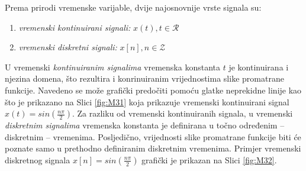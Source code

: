 \documentclass[a4paper,12pt,oneside]{memoir}
\begin{document}
            Prema prirodi vremenske varijable, dvije najosnovnije vrste signala su:
            \begin{enumerate}
                \item \textit{vremenski kontinuirani signali:} $x(t), t\in \mathcal{R}$
                \item \textit{vremenski diskretni signali:} $x[n], n \in \mathcal{Z}$
            \end{enumerate}

            U vremenski \textit{kontinuiranim signalima} vremenska konstanta $t$ je kontinuirana i njezina domena, što rezultira i konrinuiranim vrijednostima slike promatrane funkcije. Navedeno se može grafički predočiti pomoću glatke neprekidne linije kao što je prikazano na Slici \ref{fig:M31} koja prikazuje vremenski kontinuirani signal $x(t)=sin(\frac{n\pi}{2})$. Za razliku od vremenski kontinuiranih signala, u vremenski \textit{diskretnim signalima} vremenska konstanta je definirana u točno određenim -- diskretnim -- vremenima. Posljedično, vrijednosti slike promatrane funkcije biti će poznate samo u prethodno definiranim diskretnim vremenima. Primjer vremenski diskretnog signala $x[n]=sin(\frac{n\pi}{2})$ grafički je prikazan na Slici \ref{fig:M32}.
\end{document}
